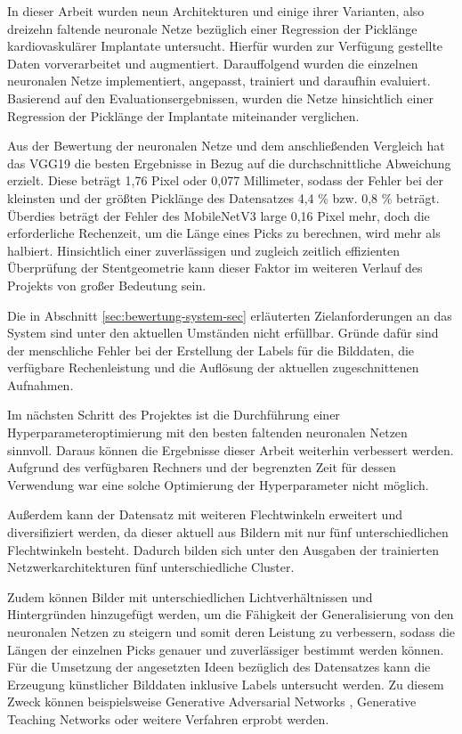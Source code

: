 In dieser Arbeit wurden neun Architekturen und einige ihrer Varianten, also dreizehn faltende neuronale Netze bezüglich einer Regression der Picklänge kardiovaskulärer Implantate untersucht. Hierfür wurden zur Verfügung gestellte Daten vorverarbeitet und augmentiert. Darauffolgend wurden die einzelnen neuronalen Netze implementiert, angepasst, trainiert und daraufhin evaluiert. Basierend auf den Evaluationsergebnissen, wurden die Netze hinsichtlich einer Regression der Picklänge der Implantate miteinander verglichen. 

\mypar Aus der Bewertung der neuronalen Netze und dem anschließenden Vergleich hat das VGG19 die besten Ergebnisse in Bezug auf die durchschnittliche Abweichung erzielt. Diese beträgt 1,76 Pixel oder 0,077 Millimeter, sodass der Fehler bei der kleinsten und der größten Picklänge des Datensatzes 4,4 {\%} bzw. 0,8 {\%} beträgt. Überdies beträgt der Fehler des MobileNetV3 large 0,16 Pixel mehr, doch die erforderliche Rechenzeit, um die Länge eines Picks zu berechnen, wird mehr als halbiert. Hinsichtlich einer zuverlässigen und zugleich zeitlich effizienten Überprüfung der Stentgeometrie kann dieser Faktor im weiteren Verlauf des Projekts von großer Bedeutung sein.

\mypar Die in Abschnitt \ref{sec:bewertung-system-sec} erläuterten Zielanforderungen an das System sind unter den aktuellen Umständen nicht erfüllbar. Gründe dafür sind der menschliche Fehler bei der Erstellung der Labels für die Bilddaten, die verfügbare Rechenleistung und die Auflösung der aktuellen zugeschnittenen Aufnahmen.

\mypar Im nächsten Schritt des Projektes ist die Durchführung einer Hyperparameteroptimierung mit den besten faltenden neuronalen Netzen sinnvoll. Daraus können die Ergebnisse dieser Arbeit weiterhin verbessert werden. Aufgrund des verfügbaren Rechners und der begrenzten Zeit für dessen Verwendung war eine solche Optimierung der Hyperparameter nicht möglich.

\mypar Außerdem kann der Datensatz mit weiteren Flechtwinkeln erweitert und diversifiziert werden, da dieser aktuell aus Bildern mit nur fünf unterschiedlichen Flechtwinkeln besteht. Dadurch bilden sich unter den Ausgaben der trainierten Netzwerkarchitekturen fünf unterschiedliche Cluster.

\mypar Zudem können Bilder mit unterschiedlichen Lichtverhältnissen und Hintergründen hinzugefügt werden, um die Fähigkeit der Generalisierung von den neuronalen Netzen zu steigern und somit deren Leistung zu verbessern, sodass die Längen der einzelnen Picks genauer und zuverlässiger bestimmt werden können. Für die Umsetzung der angesetzten Ideen bezüglich des Datensatzes kann die Erzeugung künstlicher Bilddaten inklusive Labels untersucht werden. Zu diesem Zweck können beispielsweise Generative Adversarial Networks \cite{goodfellow2014generative}, Generative Teaching Networks \cite{such2020generative} oder weitere Verfahren erprobt werden.